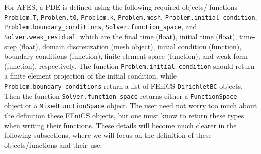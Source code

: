     For AFES, a PDE is defined using the following required objects\slash
    functions \texttt{Problem.T}, \texttt{Problem.t0}, \texttt{Problem.k},
    \texttt{Problem.mesh}, \texttt{Problem.initial\_condition},
    \texttt{Problem.boundary\_conditions}, \texttt{Solver.function\_space}, and
    \texttt{Solver.weak\_residual}, which are the final time (float), initial
    time (float), time-step (float), domain discretization (mesh object),
    initial condition (function), boundary conditions (function), finite element
    space (function), and weak form (function), respectively. The function
    \texttt{Problem.initial\_condition} should return a finite element
    projection of the initial condition, while
    \texttt{Problem.boundary\_conditions} return a list of FEniCS
    \texttt{DirichletBC} objects. Then the function
    \texttt{Solver.function\_space} returns either a \texttt{FunctionSpace}
    object or a \texttt{MixedFunctionSpace} object. The user need not worry too
    much about the definition these FEniCS objects, but one must know to return
    these types when writing their functions. These details will become much
    clearer in the following subsections, where we will focus on the definition
    of these objects\slash functions and their use.

